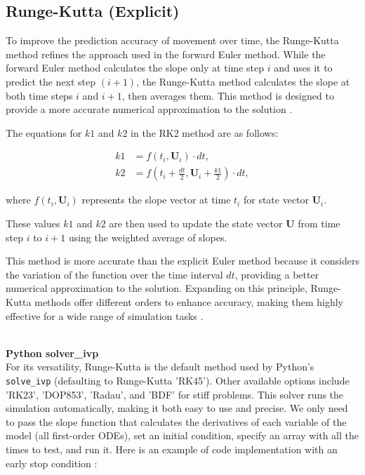 \documentclass[runningheads]{llncs}
\begin{document}
\subsection{Runge-Kutta (Explicit)}
To improve the prediction accuracy of movement over time, the Runge-Kutta method refines the approach used in the forward Euler method. While the forward Euler method calculates the slope only at time step \( i \) and uses it to predict the next step \( (i+1) \), the Runge-Kutta method calculates the slope at both time steps \( i \) and \( i+1 \), then averages them. This method is designed to provide a more accurate numerical approximation to the solution \cite{misc_rocket}.

The equations for \( k1 \) and \( k2 \) in the RK2 method are as follows:

\[
\begin{aligned}
k1 & = f(t_i, \mathbf{U}_i) \cdot dt, \\
k2 & = f(t_i + \frac{dt}{2}, \mathbf{U}_i + \frac{k1}{2}) \cdot dt,
\end{aligned}
\]

where \( f(t_i, \mathbf{U}_i) \) represents the slope vector at time \( t_i \) for state vector \( \mathbf{U}_i \).

These values \( k1 \) and \( k2 \) are then used to update the state vector \( \mathbf{U} \) from time step \( i \) to \( i+1 \) using the weighted average of slopes.

This method is more accurate than the explicit Euler method because it considers the variation of the function over the time interval \( dt \), providing a better numerical approximation to the solution. Expanding on this principle, Runge-Kutta methods offer different orders to enhance accuracy, making them highly effective for a wide range of simulation tasks \cite{github_reentry}.


\textbf{\\Python solver\_ivp\\}
For its versatility, Runge-Kutta is the default method used by Python's \texttt{solve\_ivp} (defaulting to Runge-Kutta 'RK45'). Other available options include 'RK23', 'DOP853', 'Radau', and 'BDF' for stiff problems. This solver runs the simulation automatically, making it both easy to use and precise. We only need to pass the slope function that calculates the derivatives of each variable of the model (all first-order ODEs), set an initial condition, specify an array with all the times to test, and run it. Here is an example of code implementation with an early stop condition \cite{misc_rocket}:
\end{document}
